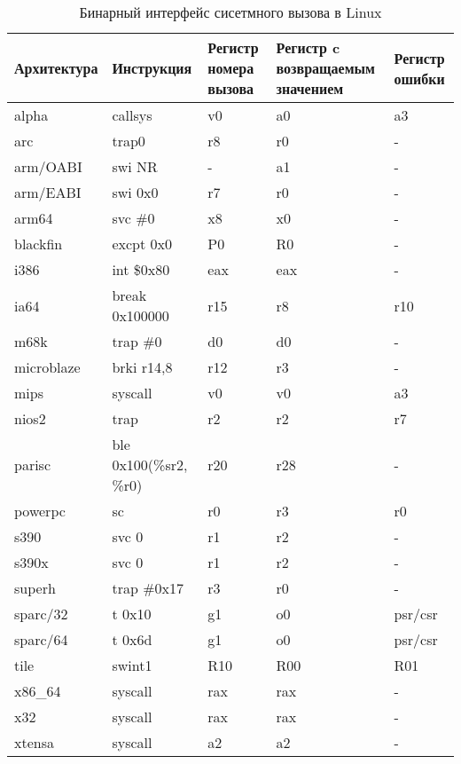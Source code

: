 \begin{table}
  \caption{Бинарный интерфейс сисетмного вызова в Linux}
  \label{table:syscall_abi}
  \begin{tabular}{| >{\raggedright}m{}
                  | >{}m{}
                  | >{}m{}
                  | >{}m{}
                  | >{\arraybackslash}m{}|}
    \hline
    Архитектура & Инструкция & Регистр номера вызова & Регистр c возвращаемым значением & Регистр ошибки \\ \hline
    alpha & callsys & v0 & a0 & a3 \\ \hline
    arc & trap0 & r8 & r0 & - \\ \hline
    arm/OABI & swi NR & - & a1 & - \\ \hline
    arm/EABI & swi 0x0 & r7 & r0 & - \\ \hline
    arm64 & svc \#0 & x8 & x0 & - \\ \hline
    blackfin & excpt 0x0 & P0 & R0 & - \\ \hline
    i386 & int \$0x80 & eax & eax & - \\ \hline
    ia64 & break 0x100000 & r15 & r8 & r10 \\ \hline
    m68k & trap \#0 & d0 & d0 &  - \\ \hline
    microblaze & brki r14,8 & r12 & r3 & - \\ \hline
    mips & syscall & v0 & v0 & a3 \\ \hline
    nios2 & trap & r2 & r2 & r7 \\ \hline
    parisc & ble 0x100(\%sr2, \%r0) & r20 & r28 & - \\ \hline
    powerpc & sc & r0 & r3 & r0 \\ \hline
    s390 & svc 0 & r1 & r2 & - \\ \hline
    s390x & svc 0 & r1 & r2 & - \\ \hline
    superh & trap \#0x17 & r3 & r0 & - \\ \hline
    sparc/32 & t 0x10 & g1 & o0 & psr/csr \\ \hline
    sparc/64 & t 0x6d & g1 & o0 & psr/csr \\ \hline
    tile & swint1 & R10 & R00 & R01 \\ \hline
    x86\_64 & syscall & rax & rax & - \\ \hline
    x32 & syscall & rax & rax & - \\ \hline
    xtensa & syscall & a2 & a2 & - \\ \hline
  \end{tabular}
\end{table}

